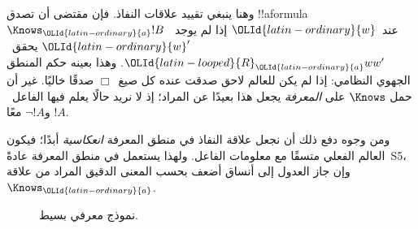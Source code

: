 \documentclass[../../../include/open-logic-section]{subfiles}
\begin{document}
وهنا ينبغي تقييد علاقات النفاذ. فإن مقتضى
 أن تصدق !!a{formula}~$\Knows_{\OLId{latin-ordinary}{a}} !B$ عند~${\OLId{latin-ordinary}{w}}$
إذا لم يوجد~${\OLId{latin-ordinary}{w}}'$ يحقق~${\OLId{latin-looped}{R}}_{\OLId{latin-ordinary}{a}} ww'$. وهذا بعينه حكم المنطق الجهوي النظامي:
إذا لم يكن للعالم لاحق صدقت عنده كل صيغ~$\Box$ صدقًا خاليًا. غير أن حمل
$\Knows$ على \emph{المعرفة} يجعل هذا بعيدًا عن المراد؛ إذ لا نريد حالًا
يعلم فيها الفاعل~$!A$ و$\lnot !A$ معًا.

ومن وجوه دفع ذلك أن نجعل علاقة النفاذ في منطق المعرفة \emph{انعكاسية}
أبدًا؛ فيكون العالم الفعلي متسقًا مع معلومات الفاعل. ولهذا يستعمل في منطق
المعرفة عادةً~S5، وإن جاز العدول إلى أنساق أضعف بحسب المعنى الدقيق المراد
من علاقة~$\Knows_{\OLId{latin-ordinary}{a}}$.

\begin{figure}
  \begin{center}
  \end{center}
  \caption{نموذج معرفي بسيط.}
\end{figure}
\end{document}
